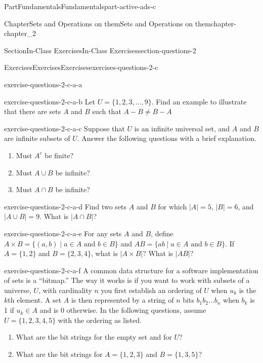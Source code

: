 \documentclass[oneside,10pt,]{book}
\numberwithin{equation}{section}
\begin{document}
\begin{partptx}{Part}{Fundamentals}{}{Fundamentals}{}{}{part-active-ads-c}
\begin{chapterptx}{Chapter}{Sets and Operations on them}{}{Sets and Operations on them}{}{}{chapter-chapter_2}
\begin{sectionptx}{Section}{In-Class Exercises}{}{In-Class Exercises}{}{}{section-questions-2}
\begin{exercises-subsection-numberless}{Exercises}{Exercises}{}{Exercises}{}{}{exercises-questions-2-c}
\begin{exercisegroup}
\begin{divisionexerciseeg}{1}{}{}{exercise-questions-2-c-a-a}
%
\end{divisionexerciseeg}%
\begin{divisionexerciseeg}{2}{}{}{exercise-questions-2-c-a-b}%
Let \(U= \{1, 2, 3, . . . , 9\}\). Find an example to illustrate that there are sets \(A\) and \(B\) such that \(A - B \neq  B - A\)%
\end{divisionexerciseeg}%
\begin{divisionexerciseeg}{3}{}{}{exercise-questions-2-c-a-c}%
Suppose that \(U\) is an infinite universal set, and \(A\) and \(B\) are infinite subsets of \(U\). Answer the following questions with a brief explanation.%
\par
%
\begin{enumerate}[label=(\alph*)]
\item{}Must \(A^c\) be finite?%
\item{}Must \(A\cup B\) be infinite?%
\item{}Must \(A\cap B\) be infinite?%
\end{enumerate}
%
\end{divisionexerciseeg}%
\begin{divisionexerciseeg}{4}{}{}{exercise-questions-2-c-a-d}%
Find two sets \(A\) and \(B\) for which \(|A| = 5\), \(|B| = 6\), and \(|A\cup B| = 9\). What is \(|A \cap B|\)?%
\end{divisionexerciseeg}%
\begin{divisionexerciseeg}{5}{}{}{exercise-questions-2-c-a-e}%
For any sets \(A\) and \(B\), define \(A\times B = \{(a,b) \mid a\in A \text{ and } b \in B\}\) and \(AB = \{ab \mid a\in A \text{ and } b \in B\}\). If \(A = \{1,2\}\) and \(B = \{2,3,4\}\),  what is \(|A \times B|\)? What is \(|AB|\)?%
\end{divisionexerciseeg}%
\begin{divisionexerciseeg}{6}{}{}{exercise-questions-2-c-a-f}%
A common data structure for a software implementation of sets is a ``bitmap.''  The way it works is if you want to work with subsets of a universe, \(U\), with cardinality \(n\) you first establish an ordering of \(U\) when \(u_k\) is the \(k\)th element.  A set \(A\) is then represented by a string of \(n\) bits  \(b_1b_2\dots b_n\) when \(b_k\) is 1 if \(u_k \in A\) and is 0 otherwise. In the following questions, assume \(U=\{1,2,3,4,5\}\) with the ordering as listed.%
\begin{enumerate}[label=(\alph*)]
\item{}What are the bit strings for the empty set and for \(U\)?%
\item{}What are the bit strings for \(A=\{1,2,3\}\) and \(B=\{1,3,5\}\)?%

\end{enumerate}
\end{divisionexerciseeg}
\end{exercisegroup}
\end{exercises-subsection-numberless}
\end{sectionptx}
\end{chapterptx}
\end{partptx}
\end{document}
